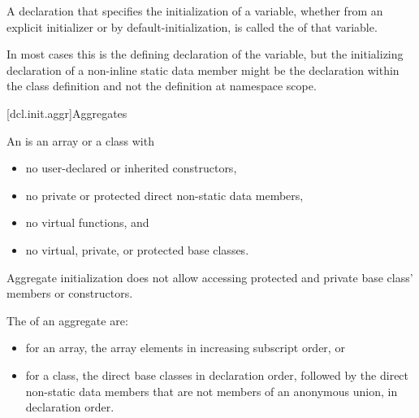 \pnum
A declaration that specifies the initialization of a variable,
whether from an explicit initializer or by default-initialization,
is called the  of that variable.
\begin{note}
In most cases
this is the defining declaration of the variable,
but the initializing declaration
of a non-inline static data member
might be the declaration within the class definition
and not the definition at namespace scope.
\end{note}

[dcl.init.aggr]{Aggregates}%
%
%
%
%
%
%

\pnum
An  is an array or a class with
\begin{itemize}
\item
no user-declared or inherited constructors,
\item
no private or protected direct non-static data members,
\item
no virtual functions, and
\item
no virtual, private, or protected base classes.
\end{itemize}
\begin{note}
Aggregate initialization does not allow accessing
protected and private base class' members or constructors.
\end{note}

\pnum
The  of an aggregate are:
\begin{itemize}
\item
for an array, the array elements in increasing subscript order, or
\item
for a class, the direct base classes in declaration order,
followed by the direct non-static data members
that are not members of an anonymous union, in declaration order.
\end{itemize}

